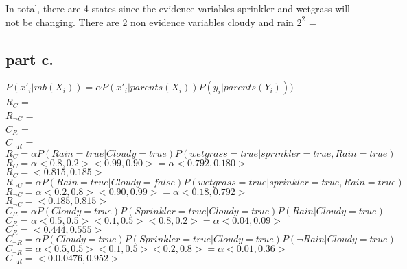   In total, there are 4 states since the evidence variables sprinkler and wetgrass will not be changing.
  There are 2 non evidence variables cloudy and rain $2^2$ = 

\subsection{part c.}

\noindent
$P(x'_i | mb(X_i)) = \alpha P(x'_i | parents(X_i)) P(y_i | parents(Y_i)))$ \\

\noindent
$R_C        $ =  \\
$R_{\neg{C}}$ =  \\
$C_R        $ =  \\
$C_{\neg{R}}$ =   \\

\noindent
$R_C        = \alpha P(Rain = true| Cloudy = true) P(wetgrass = true | sprinkler = true, Rain = true)$ \\
$R_C        = \alpha <0.8, 0.2> <0.99,0.90> = \alpha <0.792, 0.180> $\\
$R_C        =  <0.815, 0.185> $\\

\noindent
$R_{\neg{C}}  = \alpha P(Rain = true| Cloudy = false) P(wetgrass = true | sprinkler = true, Rain = true) $\\
$R_{\neg{C}}  = \alpha <0.2, 0.8> <0.90, 0.99> = \alpha <0.18, 0.792> $\\
$R_{\neg{C}}  = <0.185,0.815> $\\

\noindent
$C_R        = \alpha P(Cloudy=true) P(Sprinkler=true | Cloudy=true) P(Rain | Cloudy=true) $\\
$C_R        = \alpha <0.5, 0.5> <0.1,0.5> <0.8,0.2 > = \alpha <0.04, 0.09>  $\\
$C_R        = <0.444, 0.555> $\\

\noindent
$C_{\neg{R}}   = \alpha P(Cloudy=true) P(Sprinkler=true | Cloudy=true) P(\neg{Rain} | Cloudy=true) $\\
$C_{\neg{R}}   = \alpha <0.5, 0.5> <0.1,0.5 > <0.2,0.8 > = \alpha <0.01,0.36 >  $\\
$C_{\neg{R}}   = <0.0.0476,0.952>    $\\



